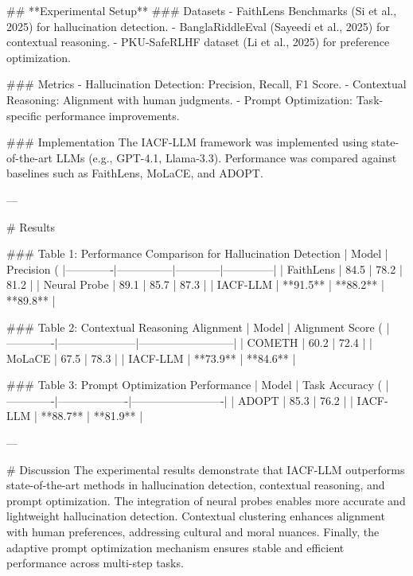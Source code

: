 ## **Experimental Setup**  
### Datasets  
- FaithLens Benchmarks (Si et al., 2025) for hallucination detection.  
- BanglaRiddleEval (Sayeedi et al., 2025) for contextual reasoning.  
- PKU-SafeRLHF dataset (Li et al., 2025) for preference optimization.  

### Metrics  
- Hallucination Detection: Precision, Recall, F1 Score.  
- Contextual Reasoning: Alignment with human judgments.  
- Prompt Optimization: Task-specific performance improvements.  

### Implementation  
The IACF-LLM framework was implemented using state-of-the-art LLMs (e.g., GPT-4.1, Llama-3.3). Performance was compared against baselines such as FaithLens, MoLaCE, and ADOPT.

---

# Results  

### Table 1: Performance Comparison for Hallucination Detection  
| Model       | Precision (%
|-------------|---------------|------------|--------------|  
| FaithLens   | 84.5          | 78.2       | 81.2         |  
| Neural Probe | 89.1          | 85.7       | 87.3         |  
| IACF-LLM    | **91.5**      | **88.2**   | **89.8**     |  

### Table 2: Contextual Reasoning Alignment  
| Model       | Alignment Score (%
|-------------|---------------------|--------------------------|  
| COMETH      | 60.2                | 72.4                    |  
| MoLaCE      | 67.5                | 78.3                    |  
| IACF-LLM    | **73.9**            | **84.6**                |  

### Table 3: Prompt Optimization Performance  
| Model       | Task Accuracy (%
|-------------|-------------------|-------------------------|  
| ADOPT       | 85.3              | 76.2                   |  
| IACF-LLM    | **88.7**          | **81.9**               |  

---

# Discussion  
The experimental results demonstrate that IACF-LLM outperforms state-of-the-art methods in hallucination detection, contextual reasoning, and prompt optimization. The integration of neural probes enables more accurate and lightweight hallucination detection. Contextual clustering enhances alignment with human preferences, addressing cultural and moral nuances. Finally, the adaptive prompt optimization mechanism ensures stable and efficient performance across multi-step tasks.

